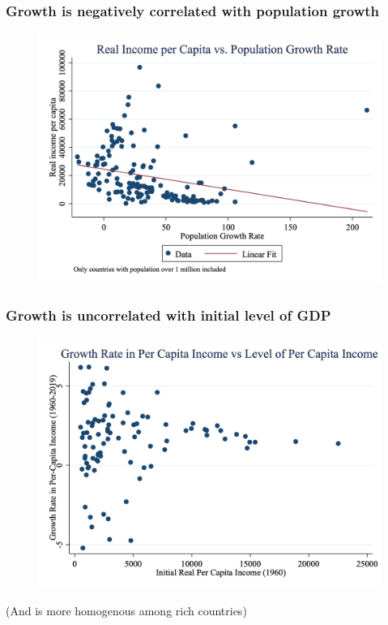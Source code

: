 \documentclass{beamer}
\begin{document}
\begin{frame}
\frametitle[alignment=center]{Growth is negatively correlated with population growth}
\begin{figure}
\centering
\includegraphics[scale=0.25]{Figures/Fig_7pt2.png}
\end{figure}

\end{frame}

\begin{frame}
\frametitle[alignment=center]{Growth is uncorrelated with initial level of GDP}
\begin{figure}
\centering
\includegraphics[scale=0.25]{Figures/Fig_7pt3.png}
\end{figure}
 (And is more homogenous among rich countries)
\end{frame}
\end{document}

